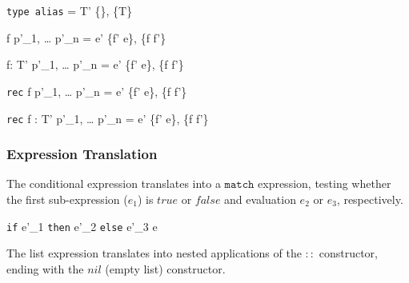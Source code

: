 \documentclass[class=article, crop=false]{standalone}
\begin{document}
  {\gamma \vdash \texttt{type alias} \; \tau = T' \Rightarrow \{\}, \gamma \cup \{\tau \rightarrow T\}}

  {\gamma \vdash f \; p'_1, \; \dots \; p'_n = e' \Rightarrow \{f' \rightarrow e\}, \gamma \cup \{f \rightarrow f'\}}

  {\gamma \vdash f: T' \; p'_1, \; \dots \; p'_n = e' \Rightarrow \{f' \rightarrow e\}, \gamma \cup \{f \rightarrow f'\}}

  {\gamma \vdash \texttt{rec} \; f \; p'_1, \; \dots \; p'_n = e' \Rightarrow \{f' \rightarrow e\}, \gamma \cup \{f \rightarrow f'\}}

  {\gamma \vdash \texttt{rec} \; f : T' \; p'_1, \; \dots \; p'_n = e' \Rightarrow \{f' \rightarrow e\}, \gamma \cup \{f \rightarrow f'\}}

\subsubsection{Expression Translation}

The conditional expression translates into a $\texttt{match}$ expression, testing whether the first sub-expression ($e_1$) is $true$ or $false$ and evaluation $e_2$ or $e_3$, respectively.

  {\gamma \vdash \texttt{if} \; e'_1\; \texttt{then} \; e'_2 \; \texttt{else} \; e'_3 \Rightarrow e}

\bigskip

The list expression translates into nested applications of the $::$ constructor, ending with the $nil$ (empty list) constructor.
\end{document}
